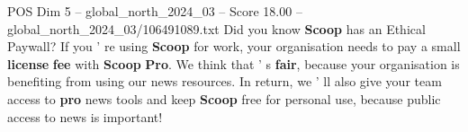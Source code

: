 \begin{textsample}{POS Dim 5 – global\_north\_2024\_03 – Score 18.00 – global\_north\_2024\_03/106491089.txt}
Did you know \textbf{Scoop} has an Ethical Paywall?
If you ' re using \textbf{Scoop} for work, your organisation needs to pay a small \textbf{license} \textbf{fee} with \textbf{Scoop} \textbf{Pro}.
We think that ' s \textbf{fair}, because your organisation is benefiting from using our news resources.
In return, we ' ll also give your team access to \textbf{pro} news tools and keep \textbf{Scoop} free for personal use, because public access to news is important!

\end{textsample}
